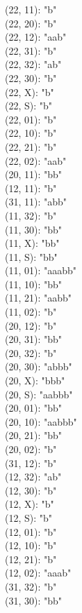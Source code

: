 \documentclass[12pt,a4paper]{article}
\begin{document}
\begin{multicols}{5}
\noindent\small
(22, 11): "b" \\
(22, 20): "b" \\
(22, 12): "aab" \\
(22, 31): "b" \\
(22, 32): "ab" \\
(22, 30): "b" \\
(22, X):  "b" \\
(22, S):  "b" \\
(22, 01): "b" \\
(22, 10): "b" \\
(22, 21): "b" \\
(22, 02): "aab" \\
(20, 11): "bb" \\
(12, 11): "b" \\
(31, 11): "abb" \\
(11, 32): "b" \\
(11, 30): "bb" \\
(11, X):  "bb" \\
(11, S):  "bb" \\
(11, 01): "aaabb" \\
(11, 10): "bb" \\
(11, 21): "aabb" \\
(11, 02): "b" \\
(20, 12): "b" \\
(20, 31): "bb" \\
(20, 32): "b" \\
(20, 30): "abbb" \\
(20, X):  "bbb" \\
(20, S):  "aabbb" \\
(20, 01): "bb" \\
(20, 10): "aabbb" \\
(20, 21): "bb" \\
(20, 02): "b" \\
(31, 12): "b" \\
(12, 32): "ab" \\
(12, 30): "b" \\
(12, X):  "b" \\
(12, S):  "b" \\
(12, 01): "b" \\
(12, 10): "b" \\
(12, 21): "b" \\
(12, 02): "aaab" \\
(31, 32): "b" \\
(31, 30): "bb" \\

\end{multicols}
\end{document}
